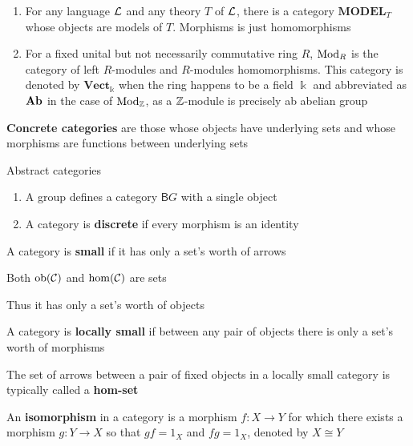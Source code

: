 \documentclass[11pt]{article}
\def \MODEL {\textbf{MODEL}}
\def \Vect {\textbf{Vect}}
\def \BG {\textsf{B}G}
\begin{document}
\begin{examplle}[]
\begin{enumerate}
\item For any language \(\mathcal{L}\) and any theory \(T\) of \(\mathcal{L}\), there is a category \(\MODEL_T\) whose
objects are models of \(T\). Morphisms is just homomorphisms
\item For a fixed unital but not necessarily commutative ring \(R\), \(\operatorname{Mod}_R\) is the category of
left \(R\)-modules and \(R\)-modules homomorphisms. This category is denoted by \(\Vect_{\Bbbk}\)
when the ring happens to be a field \(\Bbbk\) and abbreviated as \(\operatorname{\textbf{Ab}}\) in the case
of \(\operatorname{Mod}_{\mathbb{Z}}\), as a \(\mathbb{Z}\)-module is precisely ab abelian group
\end{enumerate}
\end{examplle}

\textbf{Concrete categories} are those whose objects have underlying sets and whose morphisms are
functions between underlying sets

Abstract categories
\begin{examplle}[]
\begin{enumerate}
\item A group defines a category \(\BG\) with a single object
\item A category is \textbf{discrete} if every morphism is an identity
\end{enumerate}
\end{examplle}

\begin{definition}[]
A category is \textbf{small} if it has only a set's worth of arrows

Both \(\operatorname{ob}(\mathcal{C})\) and \(\operatorname{hom}(\mathcal{C})\) are sets
\end{definition}

Thus it has only a set's worth of objects

\begin{definition}[]
A category is \textbf{locally small} if between any pair of objects there is only a set's worth of morphisms
\end{definition}

The set of arrows between a pair of fixed objects in a locally small category is typically
called a \textbf{hom-set}


\begin{definition}[]
An \textbf{isomorphism} in a category is a morphism \(f:X\to Y\) for which there exists a
morphism \(g:Y\to X\) so that \(gf=1_X\) and \(fg=1_X\), denoted by \(X\cong Y\)
\end{definition}
\end{document}
